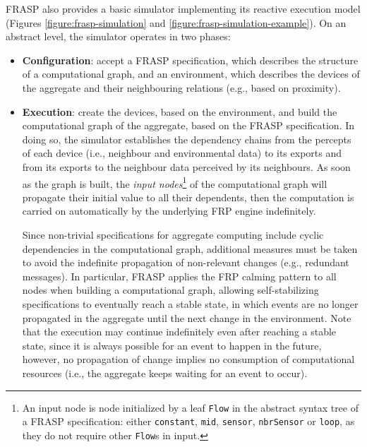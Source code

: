 FRASP also provides a basic simulator implementing its reactive execution model
(Figures \ref{figure:frasp-simulation} and
\ref{figure:frasp-simulation-example}). On an abstract level, the simulator
operates in two phases:
\begin{itemize}
  \item \textbf{Configuration}: accept a FRASP specification, which describes
        the structure of a computational graph, and an environment, which
        describes the devices of the aggregate and their neighbouring relations
        (e.g., based on proximity).
  \item \textbf{Execution}: create the devices, based on the environment, and
        build the computational graph of the aggregate, based on the FRASP
        specification. In doing so, the simulator establishes the dependency
        chains from the percepts of each device (i.e., neighbour and
        environmental data) to its exports and from its exports to the
        neighbour data perceived by its neighbours. As soon as the graph is
        built, the \textit{input nodes}\footnote{
          An input node is node initialized by a leaf \texttt{Flow} in the
          abstract syntax tree of a FRASP specification: either
          \texttt{constant}, \texttt{mid}, \texttt{sensor}, \texttt{nbrSensor}
          or \texttt{loop}, as they do not require other \texttt{Flow}s in
          input.
        } of the computational graph will propagate their initial value to all
        their dependents, then the computation is carried on automatically by
        the underlying \ac{FRP} engine indefinitely.

        Since non-trivial specifications for aggregate computing include cyclic
        dependencies in the computational graph, additional measures must be
        taken to avoid the indefinite propagation of non-relevant changes
        (e.g., redundant messages). In particular, FRASP applies the FRP
        calming pattern to all nodes when building a computational graph,
        allowing self-stabilizing specifications to eventually reach a stable
        state, in which events are no longer propagated in the aggregate until
        the next change in the environment. Note that the execution may
        continue indefinitely even after reaching a stable state, since it is
        always possible for an event to happen in the future, however, no
        propagation of change implies no consumption of computational resources
        (i.e., the aggregate keeps waiting for an event to occur).
\end{itemize}


